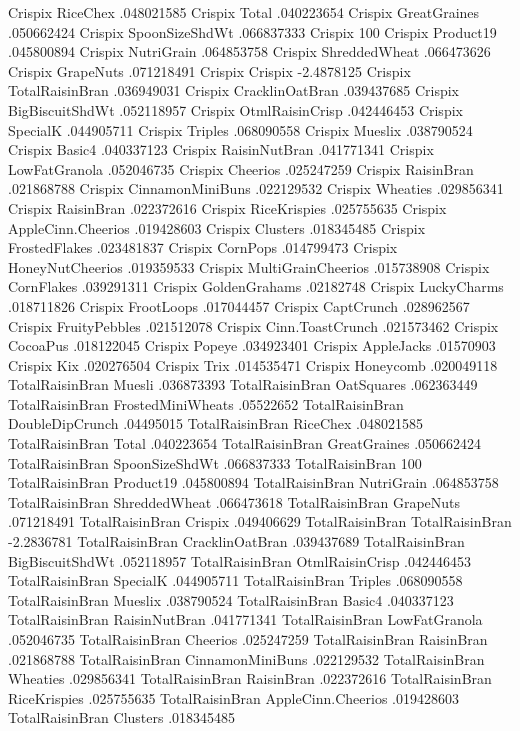 Crispix	RiceChex	.048021585
Crispix	Total	.040223654
Crispix	GreatGraines	.050662424
Crispix	SpoonSizeShdWt	.066837333
Crispix	100%
Crispix	Product19	.045800894
Crispix	NutriGrain	.064853758
Crispix	ShreddedWheat	.066473626
Crispix	GrapeNuts	.071218491
Crispix	Crispix	-2.4878125
Crispix	TotalRaisinBran	.036949031
Crispix	CracklinOatBran	.039437685
Crispix	BigBiscuitShdWt	.052118957
Crispix	OtmlRaisinCrisp	.042446453
Crispix	SpecialK	.044905711
Crispix	Triples	.068090558
Crispix	Mueslix	.038790524
Crispix	Basic4	.040337123
Crispix	RaisinNutBran	.041771341
Crispix	LowFatGranola	.052046735
Crispix	Cheerios	.025247259
Crispix	RaisinBran	.021868788
Crispix	CinnamonMiniBuns	.022129532
Crispix	Wheaties	.029856341
Crispix	RaisinBran	.022372616
Crispix	RiceKrispies	.025755635
Crispix	AppleCinn.Cheerios	.019428603
Crispix	Clusters	.018345485
Crispix	FrostedFlakes	.023481837
Crispix	CornPops	.014799473
Crispix	HoneyNutCheerios	.019359533
Crispix	MultiGrainCheerios	.015738908
Crispix	CornFlakes	.039291311
Crispix	GoldenGrahams	.02182748
Crispix	LuckyCharms	.018711826
Crispix	FrootLoops	.017044457
Crispix	CaptCrunch	.028962567
Crispix	FruityPebbles	.021512078
Crispix	Cinn.ToastCrunch	.021573462
Crispix	CocoaPus	.018122045
Crispix	Popeye	.034923401
Crispix	AppleJacks	.01570903
Crispix	Kix	.020276504
Crispix	Trix	.014535471
Crispix	Honeycomb	.020049118
TotalRaisinBran	Muesli	.036873393
TotalRaisinBran	OatSquares	.062363449
TotalRaisinBran	FrostedMiniWheats	.05522652
TotalRaisinBran	DoubleDipCrunch	.04495015
TotalRaisinBran	RiceChex	.048021585
TotalRaisinBran	Total	.040223654
TotalRaisinBran	GreatGraines	.050662424
TotalRaisinBran	SpoonSizeShdWt	.066837333
TotalRaisinBran	100%
TotalRaisinBran	Product19	.045800894
TotalRaisinBran	NutriGrain	.064853758
TotalRaisinBran	ShreddedWheat	.066473618
TotalRaisinBran	GrapeNuts	.071218491
TotalRaisinBran	Crispix	.049406629
TotalRaisinBran	TotalRaisinBran	-2.2836781
TotalRaisinBran	CracklinOatBran	.039437689
TotalRaisinBran	BigBiscuitShdWt	.052118957
TotalRaisinBran	OtmlRaisinCrisp	.042446453
TotalRaisinBran	SpecialK	.044905711
TotalRaisinBran	Triples	.068090558
TotalRaisinBran	Mueslix	.038790524
TotalRaisinBran	Basic4	.040337123
TotalRaisinBran	RaisinNutBran	.041771341
TotalRaisinBran	LowFatGranola	.052046735
TotalRaisinBran	Cheerios	.025247259
TotalRaisinBran	RaisinBran	.021868788
TotalRaisinBran	CinnamonMiniBuns	.022129532
TotalRaisinBran	Wheaties	.029856341
TotalRaisinBran	RaisinBran	.022372616
TotalRaisinBran	RiceKrispies	.025755635
TotalRaisinBran	AppleCinn.Cheerios	.019428603
TotalRaisinBran	Clusters	.018345485
